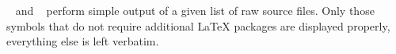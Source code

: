 \begin{isabellebody}
\begin{isamarkuptext}
  \begin{description}

  \item \hyperlink{command.display-drafts}{\mbox{}}~ and \hyperlink{command.print-drafts}{\mbox{}}~ perform simple output of a given list
  of raw source files.  Only those symbols that do not require
  additional {\LaTeX} packages are displayed properly, everything else
  is left verbatim.

  \end{description}%
\end{isamarkuptext}%
\isamarkuptrue%
%
\isadelimtheory
%
\endisadelimtheory
%
\isatagtheory
{}\isamarkupfalse%
%
\endisatagtheory
{\isafoldtheory}%
%
\isadelimtheory
%
\endisadelimtheory
\isanewline
\end{isabellebody}%
